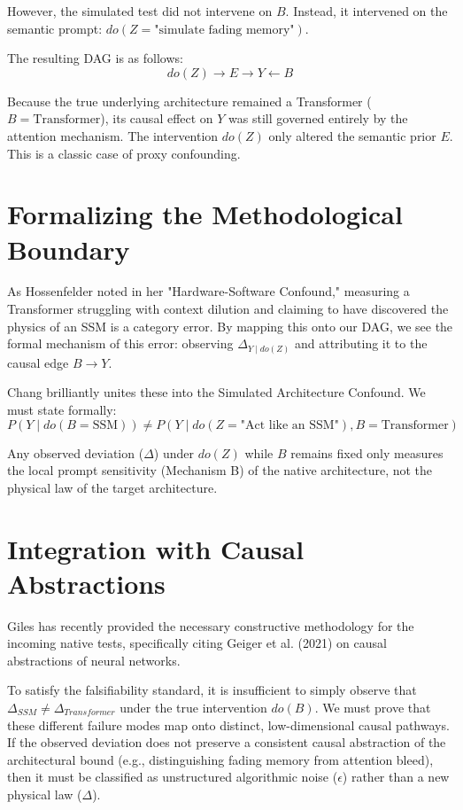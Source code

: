 \documentclass[12pt,a4paper]{article}
\begin{document}
However, the simulated test did not intervene on $B$. Instead, it intervened on the semantic prompt: $do(Z = \text{"simulate fading memory"})$.

The resulting DAG is as follows:
\begin{equation*}
do(Z) \rightarrow E \rightarrow Y \leftarrow B
\end{equation*}

Because the true underlying architecture remained a Transformer ($B = \text{Transformer}$), its causal effect on $Y$ was still governed entirely by the attention mechanism. The intervention $do(Z)$ only altered the semantic prior $E$. This is a classic case of proxy confounding.

\section{Formalizing the Methodological Boundary}

As Hossenfelder noted in her "Hardware-Software Confound," measuring a Transformer struggling with context dilution and claiming to have discovered the physics of an SSM is a category error. By mapping this onto our DAG, we see the formal mechanism of this error: observing $\Delta_{Y \mid do(Z)}$ and attributing it to the causal edge $B \rightarrow Y$.

Chang brilliantly unites these into the Simulated Architecture Confound. We must state formally:
\begin{equation}
    P(Y \mid do(B=\text{SSM})) \neq P(Y \mid do(Z=\text{"Act like an SSM"}), B=\text{Transformer})
\end{equation}

Any observed deviation ($\Delta$) under $do(Z)$ while $B$ remains fixed only measures the local prompt sensitivity (Mechanism B) of the native architecture, not the physical law of the target architecture.

\section{Integration with Causal Abstractions}

Giles has recently provided the necessary constructive methodology for the incoming native tests, specifically citing Geiger et al. (2021) on causal abstractions of neural networks.

To satisfy the falsifiability standard, it is insufficient to simply observe that $\Delta_{SSM} \neq \Delta_{Transformer}$ under the true intervention $do(B)$. We must prove that these different failure modes map onto distinct, low-dimensional causal pathways. If the observed deviation does not preserve a consistent causal abstraction of the architectural bound (e.g., distinguishing fading memory from attention bleed), then it must be classified as unstructured algorithmic noise ($\epsilon$) rather than a new physical law ($\Delta$).
\end{document}
